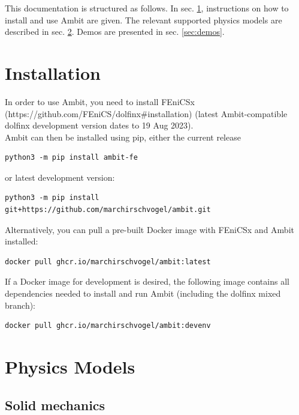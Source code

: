 \documentclass[a4paper,12pt]{report}
\begin{document}
This documentation is structured as follows. In sec. \ref{sec:inst}, instructions on how to install and use Ambit are given. The relevant supported physics models are described in sec. \ref{sec:phys}. Demos are presented in sec. \ref{sec:demos}.


\section{Installation}\label{sec:inst}

In order to use Ambit, you need to install FEniCSx (https://github.com/FEniCS/dolfinx\#installation) (latest Ambit-compatible dolfinx development version dates to 19 Aug 2023).\\

Ambit can then be installed using pip, either the current release
\begin{verbatim}
python3 -m pip install ambit-fe
\end{verbatim}

or latest development version:
\begin{verbatim}
python3 -m pip install git+https://github.com/marchirschvogel/ambit.git
\end{verbatim}

Alternatively, you can pull a pre-built Docker image with FEniCSx and Ambit installed:
\begin{verbatim}
docker pull ghcr.io/marchirschvogel/ambit:latest
\end{verbatim}

If a Docker image for development is desired, the following image contains all dependencies needed to install and run Ambit (including the dolfinx mixed branch):
\begin{verbatim}
docker pull ghcr.io/marchirschvogel/ambit:devenv
\end{verbatim}

\section{Physics Models}\label{sec:phys}

\subsection{Solid mechanics}\label{subsec:solid}
\end{document}
